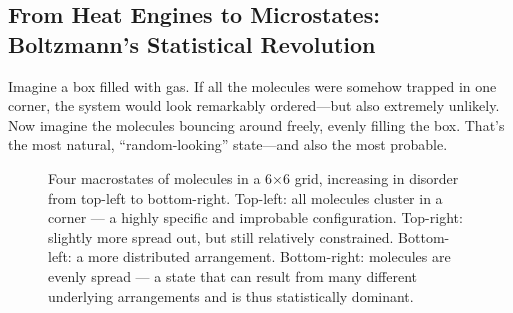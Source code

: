 \subsection{From Heat Engines to Microstates: Boltzmann’s Statistical Revolution}

Imagine a box filled with gas. If all the molecules were somehow trapped in one corner, the system would look remarkably ordered—but also extremely unlikely. Now imagine the molecules bouncing around freely, evenly filling the box. That’s the most natural, “random-looking” state—and also the most probable.

\begin{figure}[H]
\centering
{}
\caption{
Four macrostates of molecules in a 6×6 grid, increasing in disorder from top-left to bottom-right. 
Top-left: all molecules cluster in a corner — a highly specific and improbable configuration. 
Top-right: slightly more spread out, but still relatively constrained. 
Bottom-left: a more distributed arrangement. 
Bottom-right: molecules are evenly spread — a state that can result from many different underlying arrangements and is thus statistically dominant.
}
\end{figure}






